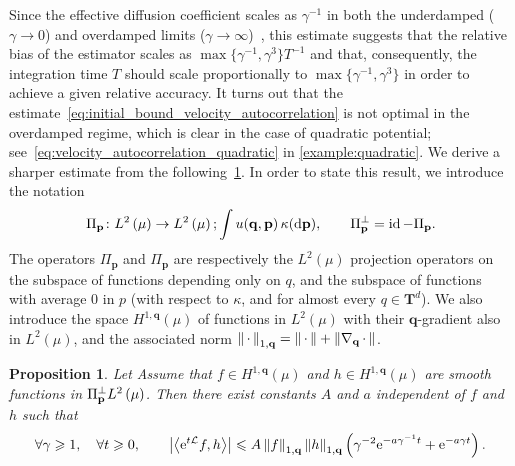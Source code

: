 \documentclass[11pt,a4paper]{article}
\DeclareMathOperator{\id}{id}
\newcommand{\e}{\mathrm{e}}
\newcommand{\dummy}{\,\cdot\,}
\newcommand{\torus}{\mathbf T}
\newcommand{\grad}{\nabla}
\newcommand{\vect}[1]{\boldsymbol{\mathbf #1}}
\renewcommand{\d}{\mathrm d}
\theoremstyle{plain}
\newtheorem{proposition}[theorem]{Proposition}
\numberwithin{equation}{section}
\renewcommand{\leq}{\leqslant}
\renewcommand{\geq}{\geqslant}
\begin{document}
Since the effective diffusion coefficient scales as $\gamma^{-1}$ in both the underdamped ($\gamma \to 0$) and overdamped limits ($\gamma \to \infty$)~\cite{MR2394704,MR2427108},
this estimate suggests that the relative bias of the estimator scales as $\max\{\gamma^{-1}, \gamma^3\} T^{-1}$ and that,
consequently, the integration time $T$ should scale proportionally to $\max\{\gamma^{-1}, \gamma^3\}$ in order to achieve a given relative accuracy.
It turns out that the estimate~\eqref{eq:initial_bound_velocity_autocorrelation} is not optimal in the overdamped regime,
which is clear in the case of quadratic potential; see~\eqref{eq:velocity_autocorrelation_quadratic} in \cref{example:quadratic}.
We derive a sharper estimate from the following~\cref{proposition:semigroup_meanzero_observable}.
In order to state this result,
we introduce the notation
\[
    \Pi_{\vect p}\colon \lp{2}{\mu} \rightarrow \lp{2}{\mu}; \int u(\vect q, \vect p) \, \kappa(\d \vect p),
    \qquad  \Pi_{\vect p}^\perp = \id - \Pi_{\vect p}.
\]
The operators $\Pi_{\vect p}$ and $\Pi_{\vect p}$ are respectively the $L^2(\mu)$ projection operators on
the subspace of functions depending only on $q$,
and the subspace of functions with average $0$ in $p$ (with respect to $\kappa$, and for almost every $q \in \torus^d$).
We also introduce the space $H^{1,\vect q}(\mu)$ of functions in $L^2(\mu)$ with their $\vect q$-gradient also in $L^2(\mu)$,
and the associated norm $\norm{\dummy}[1,\vect q] = \norm{\dummy} + \norm{\grad_{\vect q} \dummy}$.
\begin{proposition}
    \label{proposition:semigroup_meanzero_observable}
    Let
    Assume that $f \in H^{1,\vect q}(\mu)$ and $h \in H^{1,\vect q}(\mu)$ are smooth functions in $\Pi_{\vect p}^\perp \lp{2}{\mu}$.
    Then there exist constants $A$ and $a$ independent of $f$ and $h$ such that
    \begin{equation}
        \label{eq:optimal_decay_correlation}
        \forall \gamma \geq 1, \quad
        \forall t \geq 0, \qquad
        \abs{\ip{\e^{t \mathcal L}f}{h}}
        \leq A \norm{f}[1,\vect q]  \norm{h}[1,\vect q] \left( \gamma^{-2} \e^{- a \gamma^{-1} t} + \e^{- a \gamma t} \right).
    \end{equation}
\end{proposition}
\end{document}
